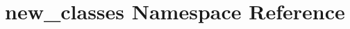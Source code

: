 \hypertarget{namespacenew__classes}{\section{new\-\_\-classes Namespace Reference}
\label{namespacenew__classes}
}
